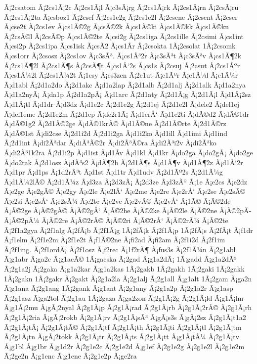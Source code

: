 {Ã¡2csatom
Ã¡2cs1Ã¡2c
Ã¡2cs1Ã¡l
Ã¡c3sÃ¡rg
Ã¡2cs1Ã¡rk
Ã¡2cs1Ã¡rn
Ã¡2csÃ¡ru
Ã¡2cs1Ã¡2ta
Ã¡csboz1
Ã¡2csef
Ã¡2cs1e2g
Ã¡2cs1e2l
Ã¡2csene
Ã¡2csent
Ã¡2cser
Ã¡cse2t
Ã¡2cs1ev
Ã¡cs1Ã©2g
Ã¡csÃ©2k
Ã¡cs1Ã©ki
Ã¡cs1Ã©kk
Ã¡cs1Ã©kn
Ã¡2csÃ©l
Ã¡2csÃ©p
Ã¡cs1Ã©2te
Ã¡csi2g
Ã¡2cs1iga
Ã¡2cs1ille
Ã¡2csimi
Ã¡cs1int
Ã¡csi2p
Ã¡2cs1ipa
Ã¡cs1isk
Ã¡csÃ­2
Ã¡cs1Ã­r
Ã¡2csokta
1Ã¡2csolat
1Ã¡2csomk
Ã¡cs1orr
Ã¡2csosz
Ã¡2cs1ov
Ã¡c3sÃ³.
Ã¡cs1Ã³2r
Ã¡c3sÃ³t
Ã¡c3sÃ³v
Ã¡cs1Ã¶2k
Ã¡2cs1Ã¶2l
Ã¡2cs1Ã¶s
Ã¡2csÃ¶t
Ã¡cs1Å‘2s
Ã¡cs1s
Ã¡2csuj
Ã¡2csut
Ã¡2cs1Ãºr
Ã¡cs1Ã¼2l
Ã¡2cs1Ã¼2t
Ã¡1csy
Ã¡cs3zen
Ã¡2c1ut
Ã¡c1Ãºr
Ã¡c1Ã¼l
Ã¡c1Ã¼r
Ã¡d1abl
Ã¡2d1a2do
Ã¡2d1akc
Ã¡d1a2lap
Ã¡2d1alb
Ã¡2d1alj
Ã¡2d1alk
Ã¡d1a2nya
Ã¡d1a2nyÃ¡
Ã¡da1p
Ã¡2d1a2pÃ¡
Ã¡d1arc
Ã¡2d1aty
Ã¡2d1Ã¡g
Ã¡2d1Ã¡l
Ã¡d1Ã¡2sz
Ã¡d1Ã¡tl
Ã¡d1dr
Ã¡d3dz
Ã¡d1e2c
Ã¡2d1e2g
Ã¡2d1ej
Ã¡2d1e2l
Ã¡dele2
Ã¡del1ej
Ã¡del1eme
Ã¡2d1e2m
Ã¡2d1ep
Ã¡de2r1Ã¡
Ã¡d1erÅ‘
Ã¡d1e2ti
Ã¡dÃ©d2
Ã¡dÃ©1dr
Ã¡dÃ©1g2
Ã¡2d1Ã©2ge
Ã¡dÃ©1krÃ©
Ã¡d1Ã©ne
Ã¡2d1Ã©rte
Ã¡2d1Ã©rz
Ã¡dÃ©1st
Ã¡di2cse
Ã¡2d1i2d
Ã¡2d1i2ga
Ã¡d1i2ko
Ã¡d1ill
Ã¡d1imi
Ã¡d1ind
Ã¡2d1int
Ã¡di2Ã³dar
Ã¡diÃ³Ã©2r
Ã¡di2Ã³Ã©ra
Ã¡di2Ã³i2v
Ã¡di2Ã³ko
Ã¡di2Ã³1k2ra
Ã¡2d1i2p
Ã¡d1ist
Ã¡d1Ã­v
Ã¡d1kl
Ã¡d1kr
Ã¡do2ga
Ã¡do2gÃ¡
Ã¡do2ge
Ã¡do2rak
Ã¡2d1osz
Ã¡dÃ³s2
Ã¡dÃ¶2b
Ã¡2d1Ã¶s
Ã¡d1Ã¶v
Ã¡d1Ã¶2z
Ã¡d1Å‘2r
Ã¡d1pr
Ã¡d1ps
Ã¡1d2rÃ³t
Ã¡d1st
Ã¡d1tr
Ã¡d1udv
Ã¡2d1Ãº2s
Ã¡2d1Ã¼g
Ã¡d1Ã¼2lÃ©
Ã¡2d1Ã¼z
Ã¡d3za
Ã¡2d3zÃ¡
Ã¡2d3ze
Ã¡d3zÃº
Ã¡1e
Ã¡e2cs
Ã¡e2dz
Ã¡e2ge
Ã¡e2gÃ©
Ã¡e2gy
Ã¡e2le
Ã¡e2lÅ‘
Ã¡e2me
Ã¡e2re
Ã¡e2rÅ‘
Ã¡e2se
Ã¡e2sÃ©
Ã¡e2si
Ã¡e2sÅ‘
Ã¡e2sÃ¼
Ã¡e2te
Ã¡e2ve
Ã¡e2vÃ©
Ã¡e2vÅ‘
Ã¡1Ã©
Ã¡Ã©2de
Ã¡Ã©2ge
Ã¡Ã©2gÃ©
Ã¡Ã©2gÅ‘
Ã¡Ã©2he
Ã¡Ã©2ke
Ã¡Ã©2le
Ã¡Ã©2ne
Ã¡Ã©2pÃ­
Ã¡Ã©2pÃ¼
Ã¡Ã©2re
Ã¡Ã©2rÃ©
Ã¡Ã©2ri
Ã¡Ã©2rÅ‘
Ã¡Ã©2rÃ¼
Ã¡Ã©2te
Ã¡2f1a2gya
Ã¡2f1alg
Ã¡2fÃ¡b
Ã¡2f1Ã¡g
1Ã¡2fÃ¡k
Ã¡2f1Ã¡p
1Ã¡2fÃ¡s
Ã¡2fÃ¡t
Ã¡f1dr
Ã¡f1elm
Ã¡2f1e2m
Ã¡2f1e2t
Ã¡f1Ã©2ne
Ã¡fi2ad
Ã¡fi2am
Ã¡2f1i2d
Ã¡2f1im
Ã¡2f1ing.
Ã¡2f1ordÃ¡
Ã¡2f1osz
Ã¡f2rec
Ã¡1f2rÃ¶
Ã¡fus3s
Ã¡2f1Ã¼n
Ã¡2g1abl
Ã¡g1abr
Ã¡ga2c
Ã¡g1acÃ©
1Ã¡gacska
Ã¡2gad
Ã¡g1a2dÃ¡
1Ã¡gadd
Ã¡g1a2dÃ³
Ã¡2g1a2j
Ã¡2gaka
Ã¡g1a2kar
Ã¡g1a2kas
1Ã¡2gakb
1Ã¡2gakh
1Ã¡2gaki
1Ã¡2gakk
1Ã¡2gakn
1Ã¡2gakr
Ã¡2gakt
Ã¡2g1a2la
Ã¡2g1alj
Ã¡2g1all
Ã¡g1alt
1Ã¡2gam
Ã¡ga2n
Ã¡g1ana
Ã¡2g1ang
1Ã¡2gank
Ã¡g1ant
Ã¡2g1any
Ã¡2g1a2p
Ã¡2g1a2r
Ã¡g1asp
Ã¡2g1asz
Ã¡ga2tol
Ã¡2g1au
1Ã¡2gaza
Ã¡ga2zon
Ã¡2g1Ã¡2g
Ã¡2g1Ã¡ld
Ã¡g1Ã¡lm
Ã¡g1Ã¡2mu
Ã¡gÃ¡2nyal
Ã¡2g1Ã¡p
Ã¡2g1Ã¡rad
Ã¡2g1Ã¡rb
Ã¡2g1Ã¡2rÃ©
Ã¡2g1Ã¡rh
Ã¡2g1Ã¡2ria
Ã¡gÃ¡2rokb
Ã¡2g1Ã¡rv
Ã¡2g1Ã¡sÃ³
Ã¡gÃ¡s3s
Ã¡gÃ¡2sz
Ã¡2g1Ã¡t1a2
Ã¡2g1Ã¡tÃ¡
Ã¡2g1Ã¡tÃ©
Ã¡2g1Ã¡tf
Ã¡2g1Ã¡th
Ã¡2g1Ã¡ti
Ã¡2g1Ã¡tl
Ã¡2g1Ã¡tm
Ã¡2g1Ã¡tn
Ã¡gÃ¡2tokk
Ã¡2g1Ã¡tr
Ã¡2g1Ã¡ts
Ã¡2g1Ã¡tt
Ã¡g1Ã¡tÃ¼
Ã¡2g1Ã¡tv
Ã¡g1bl
Ã¡g1br
Ã¡g1d2r
Ã¡2g1e2c
Ã¡2g1e2d
Ã¡g1ef
Ã¡2g1e2g
Ã¡2g1e2l
Ã¡2g1e2m
Ã¡2ge2n
Ã¡g1enc
Ã¡g1ene
Ã¡2g1e2p
Ã¡ge2ra
}
